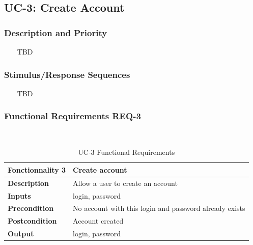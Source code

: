 \documentclass{report}
\begin{document}




\subsection{UC-3: Create Account}

\subsubsection*{Description and Priority} ~~~
TBD

\subsubsection*{Stimulus/Response Sequences} ~~~
TBD

\subsubsection*{Functional Requirements REQ-3} ~~~
\begin{table}[H]
	\begin{center}
		\begin{tabular}{|m{4cm}|m{10cm}|}
		\hline
		\textbf{Fonctionnality 3} & Create account \\
		\hline
		\textbf{Description} & Allow a user to create an account \\
		\hline
		\textbf{Inputs} & login, password \\
		\hline
		\textbf{Precondition} & No account with this login and password already exists \\
		\hline
		\textbf{Postcondition} & Account created \\
		\hline
		\textbf{Output} & login, password \\
		\hline
		\end{tabular}
	\end{center}
	\caption{UC-3 Functional Requirements}
	\label{table:REQ-3}
\end{table}
\end{document}
